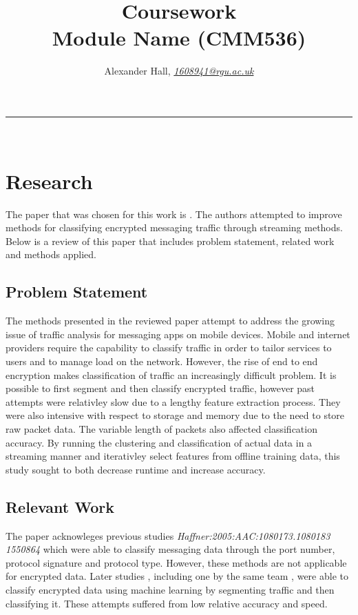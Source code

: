 \documentclass[10pt]{article}
\begin{document}



\title{\LARGE Coursework  \\ Module Name (CMM536)}

\author{Alexander Hall, \textit{\href{1608941@rgu.ac.uk}{1608941@rgu.ac.uk}}}
\maketitle
\noindent\rule{16cm}{0.4pt}
\ \\

\section{Research}

The paper that was chosen for this work is \cite{Liu:2017:ERI:3097983.3098049}. The authors attempted to improve methods for classifying encrypted messaging traffic through streaming methods. Below is a review of this paper that includes problem statement, related work and methods applied.\\


\subsection{Problem Statement}

The methods presented in the reviewed paper attempt to address the growing issue of traffic analysis for messaging apps on mobile devices. Mobile and internet providers require the capability to classify traffic in order to tailor services to users and to manage load on the network. However, the rise of end to end encryption makes classification of traffic an increasingly difficult problem. It is possible to first segment and then classify encrypted traffic, however past attempts were relativley slow due to a lengthy feature extraction process. They were also intensive with respect to storage and memory due to the need to store raw packet data. The variable length of packets also affected classification accuracy. By running the clustering and classification of actual data in a streaming manner and iterativley select features from offline training data, this study sought to both decrease runtime and increase accuracy.

\subsection{Relevant Work}
The paper acknowleges previous studies \emph{Haffner:2005:AAC:1080173.1080183} \cite{4669733}  \emph{1550864} which were able to classify messaging data through the port number, protocol signature and protocol type. However, these methods are not applicable for encrypted data. Later studies \cite{5693957}, including one by the same team \cite{7377112}, were able to classify encrypted data using machine learning by segmenting traffic and then classifying it. These attempts suffered from low relative accuracy and speed. 
\end{document}
